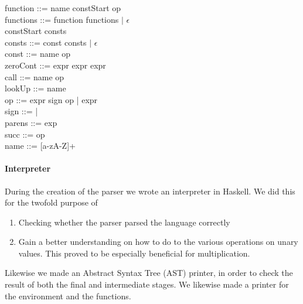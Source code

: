 function ::= name \bnf{=>} constStart op\\

functions ::= \bnf{,} function functions $\mid$ $\epsilon$\\

constStart \bnf{[} consts \bnf{]}\\

consts ::= const \bnf{,} consts $\mid$ $\epsilon$\\

const ::= name \bnf{=} op\\

zeroCont ::=  \bnf{(} expr \bnf{)} \bnf{\{} expr \bnf{\}}  \bnf{\{} expr \bnf{\}}\\

call ::=  name op\\

lookUp ::=  name\\

op ::= expr sign op | expr\\

sign ::= \bnf{+} | \bnf{*}\\

parens ::=\bnf{(} exp \bnf{)}\\

succ ::=  op\\

name ::= [a-zA-Z]+

\paragraph{Interpreter}
During the creation of the parser we wrote an interpreter in Haskell. We did this for the twofold purpose of 
\begin{enumerate}
\item Checking whether the parser parsed the language correctly
\item Gain a better understanding on how to do to the various operations on unary values. This proved to be especially beneficial for multiplication. 
\end{enumerate}
Likewise we made an Abstract Syntax Tree (AST) printer, in order to check the result of both the final and intermediate stages. We likewise made a printer for the environment and the functions.

